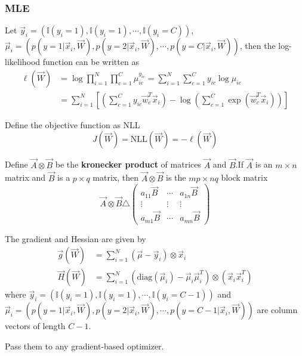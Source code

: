 \begin{refsection}
\subsubsection{MLE}
Let $\vec{y}_i=(\mathbb{I}(y_i=1),\mathbb{I}(y_i=1),\cdots, \mathbb{I}(y_i=C))$, $\vec{\mu}_i=(p(y=1|\vec{x}_i,\vec{W}),p(y=2|\vec{x}_i,\vec{W}),\cdots, p(y=C|\vec{x}_i,\vec{W}))$, then the log-likelihood function can be written as
\begin{align}
\ell(\vec{W}) & =\log\prod\limits_{i=1}^N\prod\limits_{c=1}^C \mu_{ic}^{y_{ic}}=\sum\limits_{i=1}^N\sum\limits_{c=1}^C y_{ic}\log \mu_{ic} \\
& = \sum\limits_{i=1}^N\left[\left(\sum\limits_{c=1}^C y_{ic}\vec{w}_c^T\vec{x}_i\right)-\log\left(\sum\limits_{c=1}^C \exp(\vec{w}_c^T\vec{x}_i)\right)\right]
\end{align}

Define the objective function as NLL
\begin{equation}
J(\vec{W})=\mathrm{NLL}(\vec{W})=-\ell(\vec{W})
\end{equation}

Define $\vec{A} \otimes \vec{B}$ be the \textbf{kronecker product} of matrices $\vec{A}$ and $\vec{B}$.If $\vec{A}$ is an $m \times n$ matrix and $\vec{B}$ is a $p \times q$ matrix, then $\vec{A} \otimes \vec{B}$ is the $mp \times nq$ block matrix
\begin{equation}
\vec{A} \otimes \vec{B} \triangle \left(\begin{array}{ccc}
a_{11}\vec{B} & \cdots & a_{1n}\vec{B} \\
\vdots & \vdots & \vdots \\
a_{m1}\vec{B} & \cdots & a_{mn}\vec{B}
\end{array}\right)
\end{equation}

The gradient and Hessian are given by
\begin{align}
\vec{g}(\vec{W}) & =\sum\limits_{i=1}^N (\vec{\mu}-\vec{y}_i) \otimes \vec{x}_i \\
\vec{H}(\vec{W}) & =\sum\limits_{i=1}^N (\mathrm{diag}(\vec{\mu}_i)-\vec{\mu}_i\vec{\mu}_i^T) \otimes (\vec{x}_i\vec{x}_i^T)
\end{align}
where $\vec{y}_i=(\mathbb{I}(y_i=1),\mathbb{I}(y_i=1),\cdots, \mathbb{I}(y_i=C-1))$ and $\vec{\mu}_i=(p(y=1|\vec{x}_i,\vec{W}),p(y=2|\vec{x}_i,\vec{W}),\cdots, p(y=C-1|\vec{x}_i,\vec{W}))$ are column vectors of length $C-1$.

Pass them to any gradient-based optimizer.



\end{refsection}
